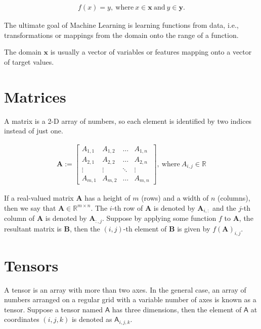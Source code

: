 \begin{align}
f(x) = y, \ \text{where} \ x \in \mathbf{x} \ \text{and} \ y \in \mathbf{y}.
\end{align}

The ultimate goal of Machine Learning is learning functions from data, i.e., transformations or mappings from the domain onto the range of a function.
\para

The domain \(\mathbf{x}\) is usually a vector of variables or features mapping onto a vector of target values.

\section{Matrices}

A matrix is a 2-D array of numbers, so each element is identified by two indices instead of just one.

\begin{align}
\mathbf{A} := \begin{bmatrix} 
A_{1,1} & A_{1,2} & \ldots & A_{1,n} \\ 
A_{2,1} & A_{2,2} & \ldots & A_{2,n} \\ 
\vdots & \vdots & \ddots & \vdots \\ 
A_{m,1} & A_{m,2} & \ldots & A_{m,n}
\end{bmatrix}, \ \text{where} \ A_{i,j} \in \mathbb{R}
\end{align}

If a real-valued matrix \(\mathbf{A}\) has a height of \(m\) (rows) and a width of \(n\) (columns), then we say that \(\mathbf{A} \in \mathbb{R}^{m \times n}\). The \(i\)-th row of \(\mathbf{A}\) is denoted by \(\mathbf{A}_{i,:}\) and the \(j\)-th column of \(\mathbf{A}\) is denoted by \(\mathbf{A}_{:,j}\). Suppose by applying some function \(f\) to \(\mathbf{A}\), the resultant matrix is \(\mathbf{B}\), then the \((i,j)\)-th element of \(\mathbf{B}\) is given by \(f(\mathbf{A})_{i,j}\).

\section{Tensors}

A tensor is an array with more than two axes. In the general case, an array of numbers arranged on a regular grid with a variable number of axes is known as a tensor. Suppose a tensor named \(\mathsf{A}\) has three dimensions, then the element of \(\mathsf{A}\) at coordinates \((i, j, k)\) is denoted as \(\mathsf{A}_{i,j,k}\).

